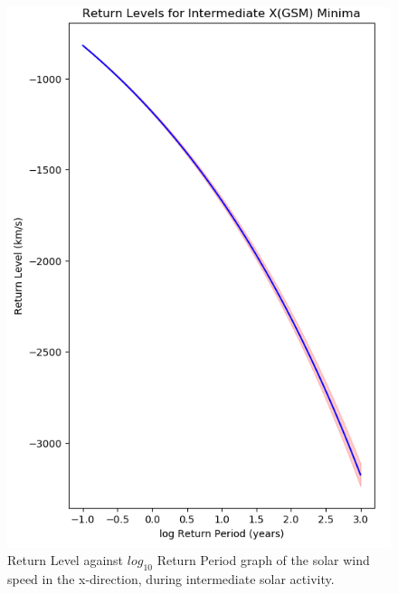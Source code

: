 \documentclass[12pt]{article}
\begin{document}
        \begin{figure}[t!]
            \begin{minipage}{0.48\textwidth}
                \centering
                \includegraphics[width=\textwidth]{fig_method/SWEintXminReturn.png}
                \caption{Return Level against $log_{10}$ Return Period graph of the solar wind speed in the x-direction, during intermediate solar activity.}
                \label{fig:SWEintXminReturn}
            \end{minipage}
            \hfill
            \begin{minipage}{0.48\textwidth}
                \centering

\end{minipage}
\end{figure}
\end{document}
